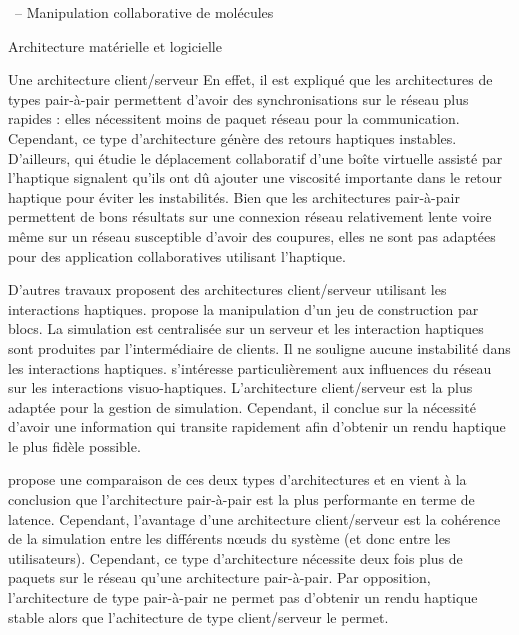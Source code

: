 \documentclass[myfrancais]{mythesis}
\begin{document}
\begin{mychapter}{\myShaddock\ -- Manipulation collaborative de molécules}
\begin{mysection}{Architecture matérielle et logicielle}
\begin{mysubsection}{Une architecture client/serveur}
				En effet, il est expliqué que les architectures de types pair-à-pair permettent d'avoir des synchronisations sur le réseau plus rapides : elles nécessitent moins de paquet réseau pour la communication.
				Cependant, ce type d'architecture génère des retours haptiques instables.
				D'ailleurs,  qui étudie le déplacement collaboratif d'une boîte virtuelle assisté par l'haptique signalent qu'ils ont dû ajouter une viscosité importante dans le retour haptique pour éviter les instabilités.
				Bien que les architectures pair-à-pair permettent de bons résultats sur une connexion réseau relativement lente voire même sur un réseau susceptible d'avoir des coupures, elles ne sont pas adaptées pour des application collaboratives utilisant l'haptique.
				
				D'autres travaux proposent des architectures client/serveur utilisant les interactions haptiques.
				 propose la manipulation d'un jeu de construction par blocs.
				La simulation est centralisée sur un serveur et les interaction haptiques sont produites par l'intermédiaire de clients.
				Il ne souligne aucune instabilité dans les interactions haptiques.
				 s'intéresse particulièrement aux influences du réseau sur les interactions visuo-haptiques.
				L'architecture client/serveur est la plus adaptée pour la gestion de simulation.
				Cependant, il conclue sur la nécessité d'avoir une information qui transite rapidement afin d'obtenir un rendu haptique le plus fidèle possible.

				 propose une comparaison de ces deux types d'architectures et en vient à la conclusion que l'architecture pair-à-pair est la plus performante en terme de latence.
				Cependant, l'avantage d'une architecture client/serveur est la cohérence de la simulation entre les différents nœuds du système (et donc entre les utilisateurs).
				Cependant, ce type d'architecture nécessite deux fois plus de paquets sur le réseau qu'une architecture pair-à-pair.
				Par opposition, l'architecture de type pair-à-pair ne permet pas d'obtenir un rendu haptique stable alors que l'achitecture de type client/serveur le permet.


\end{mysubsection}
\end{mysection}
\end{mychapter}
\end{document}

